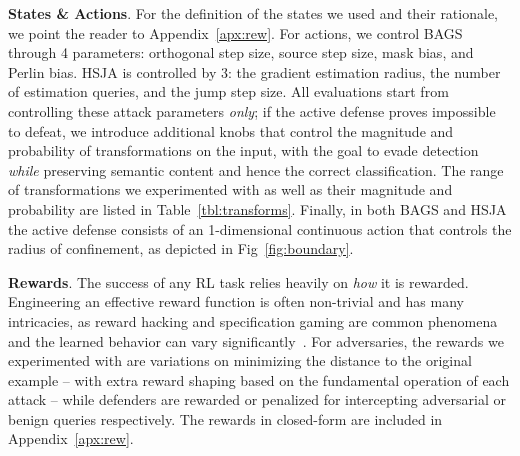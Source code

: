 \textbf{States \& Actions}. 
For the definition of the states we used and their rationale, we point the reader to Appendix~\ref{apx:rew}.
For actions, we control BAGS through 4 parameters: orthogonal step size, source step size, mask bias, and Perlin bias.
HSJA is controlled by 3: the gradient estimation radius, the number of estimation queries, and the jump step size.
All evaluations start from controlling these attack parameters \textit{only}; if the active defense proves impossible to defeat, we introduce additional knobs that control the magnitude and probability of transformations on the input, with the goal to evade detection \emph{while} preserving semantic content and hence the correct classification.
The range of transformations we experimented with as well as their magnitude and probability are listed in Table~\ref{tbl:transforms}.
Finally, in both BAGS and HSJA the active defense consists of an 1-dimensional continuous action that controls the radius of confinement, as depicted in Fig~\ref{fig:boundary}.

\textbf{Rewards}. The success of any \gls{RL} task relies heavily on \emph{how} it is rewarded.
Engineering an effective reward function is often non-trivial and has many intricacies, as reward hacking and specification gaming are common phenomena and the learned behavior can vary significantly~\cite{amodei2016concrete}.
For adversaries, the rewards we experimented with are variations on minimizing the distance to the original example -- with extra reward shaping based on the fundamental operation of each attack -- while defenders are rewarded or penalized for intercepting adversarial or benign queries respectively.
The rewards in closed-form are included in Appendix~\ref{apx:rew}.

